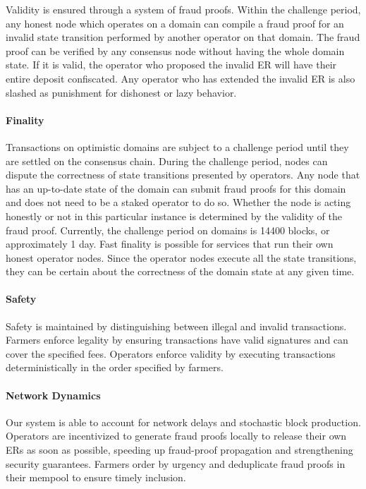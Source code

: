 \documentclass[conference]{IEEEtran}
\begin{document}
Validity is ensured through a system of fraud proofs. Within the challenge period, any honest node which operates on a domain can compile a fraud proof for an invalid state transition performed by another operator on that domain. The fraud proof can be verified by any consensus node without having the whole domain state. If it is valid, the operator who proposed the invalid ER will have their entire deposit confiscated. Any operator who has extended the invalid ER is also slashed as punishment for dishonest or lazy behavior.

\paragraph{Finality}

Transactions on optimistic domains are subject to a challenge period until they are settled on the consensus chain. During the challenge period, nodes can dispute the correctness of state transitions presented by operators. Any node that has an up-to-date state of the domain can submit fraud proofs for this domain and does not need to be a staked operator to do so. Whether the node is acting honestly or not in this particular instance is determined by the validity of the fraud proof. Currently, the challenge period on domains is 14400 blocks, or approximately 1 day. Fast finality is possible for services that run their own honest operator nodes. Since the operator nodes execute all the state transitions, they can be certain about the correctness of the domain state at any given time.

\paragraph{Safety}

Safety is maintained by distinguishing between illegal and invalid transactions. Farmers enforce legality by ensuring transactions have valid signatures and can cover the specified fees. Operators enforce validity by executing transactions deterministically in the order specified by farmers.

\paragraph{Network Dynamics}

Our system is able to account for network delays and stochastic block production. Operators are incentivized to generate fraud proofs locally to release their own ERs as soon as possible, speeding up fraud-proof propagation and strengthening security guarantees. Farmers order by urgency and deduplicate fraud proofs in their mempool to ensure timely inclusion.
\end{document}
